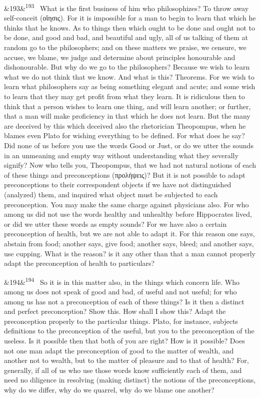 \documentclass[12pt]{article}
\newcommand{\para}[1][]{\par\noindent\ifx&#1&\else\textsuperscript{\footnotesize #1}~\fi}
\begin{document}
\para[193] What is the first business of him who philosophizes? To throw away self-conceit (οἴησις). For it is impossible for a man to begin to learn that which he thinks that he knows. As to things then which ought to be done and ought not to be done, and good and bad, and beautiful and ugly, all of us talking of them at random go to the philosophers; and on these matters we praise, we censure, we accuse, we blame, we judge and determine about principles honourable and dishonourable. But why do we go to the philosophers? Because we wish to learn what we do not think that we know. And what is this? Theorems. For we wish to learn what philosophers say as being something elegant and acute; and some wish to learn that they may get profit from what they learn. It is ridiculous then to think that a person wishes to learn one thing, and will learn another; or further, that a man will make proficiency in that which he does not learn. But the many are deceived by this which deceived also the rhetorician Theopompus, when he blames even Plato for wishing everything to be defined. For what does he say? Did none of us before you use the words Good or Just, or do we utter the sounds in an unmeaning and empty way without understanding what they severally signify? Now who tells you, Theopompus, that we had not natural notions of each of these things and preconceptions (προλήψεις)? But it is not possible to adapt preconceptions to their correspondent objects if we have not distinguished (analyzed) them, and inquired what object must be subjected to each preconception. You may make the same charge against physicians also. For who among us did not use the words healthy and unhealthy before Hippocrates lived, or did we utter these words as empty sounds? For we have also a certain preconception of health, but we are not able to adapt it. For this reason one says, abstain from food; another says, give food; another says, bleed; and another says, use cupping. What is the reason? is it any other than that a man cannot properly adapt the preconception of health to particulars?

\para[194] So it is in this matter also, in the things which concern life. Who among us does not speak of good and bad, of useful and not useful; for who among us has not a preconception of each of these things? Is it then a distinct and perfect preconception? Show this. How shall I show this? Adapt the preconception properly to the particular things. Plato, for instance, subjects definitions to the preconception of the useful, but you to the preconception of the useless. Is it possible then that both of you are right? How is it possible? Does not one man adapt the preconception of good to the matter of wealth, and another not to wealth, but to the matter of pleasure and to that of health? For, generally, if all of us who use those words know sufficiently each of them, and need no diligence in resolving (making distinct) the notions of the preconceptions, why do we differ, why do we quarrel, why do we blame one another?
\end{document}

